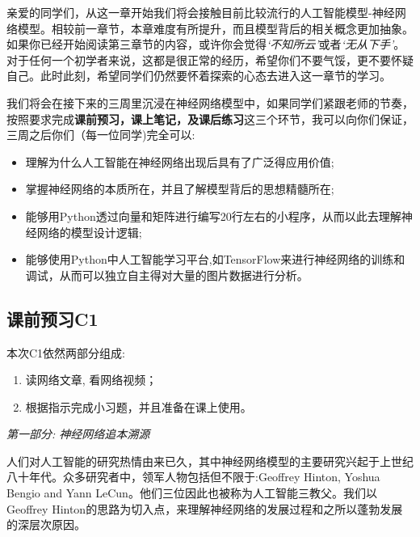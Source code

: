 \documentclass[12pt]{article}
\numberwithin{figure}{section}
\numberwithin{equation}{section}
\begin{document}

亲爱的同学们，从这一章开始我们将会接触目前比较流行的人工智能模型-神经网络模型。相较前一章节，本章难度有所提升，而且模型背后的相关概念更加抽象。如果你已经开始阅读第三章节的内容，或许你会觉得\textit{`不知所云'}或者\textit{`无从下手'}。 对于任何一个初学者来说，这都是很正常的经历，希望你们不要气馁，更不要怀疑自己。此时此刻，希望同学们仍然要怀着探索的心态去进入这一章节的学习。

我们将会在接下来的三周里沉浸在神经网络模型中，如果同学们紧跟老师的节奏，按照要求完成\textbf{课前预习，课上笔记，及课后练习}这三个环节，我可以向你们保证，三周之后你们（每一位同学)完全可以:
\begin{itemize}
	\item 理解为什么人工智能在神经网络出现后具有了广泛得应用价值;
	\item 掌握神经网络的本质所在，并且了解模型背后的思想精髓所在;
	\item 能够用Python透过向量和矩阵进行编写20行左右的小程序，从而以此去理解神经网络的模型设计逻辑;
	\item 能够使用Python中人工智能学习平台,如TensorFlow来进行神经网络的训练和调试，从而可以独立自主得对大量的图片数据进行分析。
\end{itemize}



\setcounter{section}{3}
\setcounter{subsection}{0}
\subsection{课前预习C1}

本次C1依然两部分组成:
\begin{enumerate}
	\item 读网络文章, 看网络视频；
	\item 根据指示完成小习题，并且准备在课上使用。
\end{enumerate}

\noindent
\textit{第一部分: 神经网络追本溯源}

人们对人工智能的研究热情由来已久，其中神经网络模型的主要研究兴起于上世纪八十年代。众多研究者中，领军人物包括但不限于:Geoffrey Hinton,  Yoshua Bengio and Yann LeCun。他们三位因此也被称为人工智能三教父。我们以Geoffrey Hinton的思路为切入点，来理解神经网络的发展过程和之所以蓬勃发展的深层次原因。
\end{document}
